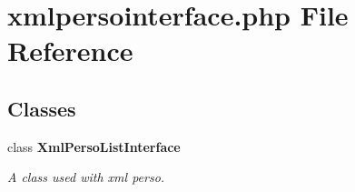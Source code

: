 \section{xmlpersointerface.php File Reference}
\label{xmlpersointerface_8php}


\subsection*{Classes}
\begin{CompactItemize}
\item 
class {\bf Xml\-Perso\-List\-Interface}
\begin{CompactList}\small\item\em A class used with xml perso. \item\end{CompactList}\end{CompactItemize}
